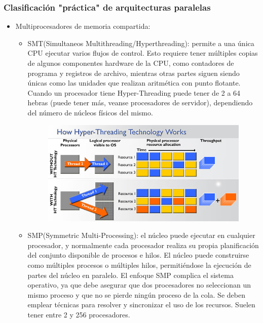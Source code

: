 \documentclass{article}
\begin{document}
\subsubsection{Clasificación "práctica" de arquitecturas paralelas}
\begin{itemize}
\item Multiprocesadores de memoria compartida:
	\begin{itemize}
	\item SMT(Simultaneos Multithreading/Hyperthreading): permite a una única CPU ejecutar varios flujos de control. Esto requiere tener múltiples copias de algunos componentes hardware de la CPU, como contadores de programa y registros de archivo, mientras otras partes siguen siendo únicas como las unidades que realizan aritmética con punto flotante. Cuando un procesador tiene Hyper-Threading puede tener de 2 a 64 hebras (puede tener más, veanse procesadores de servidor), dependiendo del número de núcleos físicos del mismo.
	
	\begin{figure}[h]
	\centering
	\includegraphics[scale=1,width=\textwidth]{Hyperthreading.jpg}
	\end{figure}
	
	\item SMP(Symmetric Multi-Processing): el núcleo puede ejecutar en cualquier procesador, y normalmente cada procesador realiza su propia planificación del conjunto disponible de procesos e hilos. El núcleo puede construirse como múltiples procesos o múltiples hilos, permitiéndose la ejecución de partes del núcleo en paralelo. El enfoque SMP complica el sistema operativo, ya que debe asegurar que dos procesadores no seleccionan un mismo proceso y que no se pierde ningún proceso de la cola. Se deben emplear técnicas para resolver y sincronizar el uso de los recursos. Suelen tener entre 2 y 256 procesadores.
	

\end{itemize}
\end{itemize}
\end{document}
